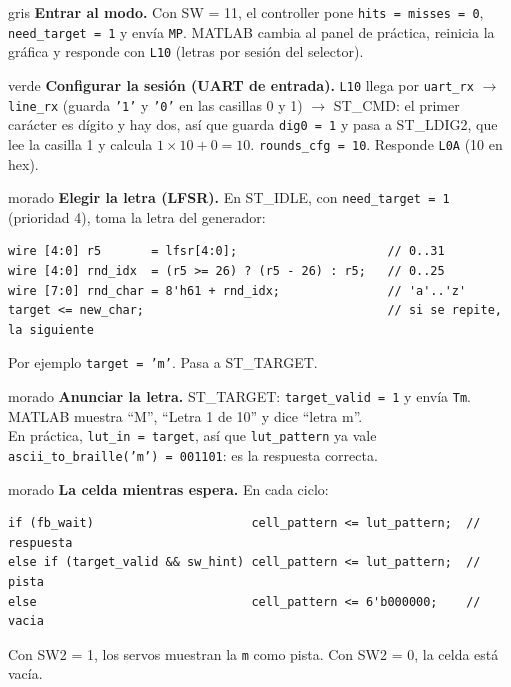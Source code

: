 \documentclass[11pt,a4paper]{article}
\newcommand{\cod}[1]{\texttt{#1}}
\begin{document}
\begin{paso}{gris}
\textbf{Entrar al modo.} Con SW = 11, el controller pone
\cod{hits = misses = 0}, \cod{need\_target = 1} y envía \cod{MP}. MATLAB cambia al
panel de práctica, reinicia la gráfica y responde con \cod{L10} (letras por sesión
del selector).
\end{paso}

\begin{paso}{verde}
\textbf{Configurar la sesión (UART de entrada).} \cod{L10} llega por
\cod{uart\_rx} $\to$ \cod{line\_rx} (guarda \cod{'1'} y \cod{'0'} en las casillas 0 y 1)
$\to$ ST\_CMD: el primer carácter es dígito y hay dos, así que guarda
\cod{dig0 = 1} y pasa a ST\_LDIG2, que lee la casilla 1 y calcula
$1 \times 10 + 0 = 10$. \cod{rounds\_cfg = 10}. Responde \cod{L0A} (10 en hex).
\end{paso}

\begin{paso}{morado}
\textbf{Elegir la letra (LFSR).} En ST\_IDLE, con \cod{need\_target = 1}
(prioridad 4), toma la letra del generador:
\begin{lstlisting}
wire [4:0] r5       = lfsr[4:0];                     // 0..31
wire [4:0] rnd_idx  = (r5 >= 26) ? (r5 - 26) : r5;   // 0..25
wire [7:0] rnd_char = 8'h61 + rnd_idx;               // 'a'..'z'
target <= new_char;                                  // si se repite, la siguiente
\end{lstlisting}
Por ejemplo \cod{target = 'm'}. Pasa a ST\_TARGET.
\end{paso}

\begin{paso}{morado}
\textbf{Anunciar la letra.} ST\_TARGET: \cod{target\_valid = 1} y envía
\cod{Tm}. MATLAB muestra ``M'', ``Letra 1 de 10'' y dice ``letra m''.\\
En práctica, \cod{lut\_in = target}, así que \cod{lut\_pattern} ya vale
\cod{ascii\_to\_braille('m') = 001101}: es la respuesta correcta.
\end{paso}

\begin{paso}{morado}
\textbf{La celda mientras espera.} En cada ciclo:
\begin{lstlisting}
if (fb_wait)                      cell_pattern <= lut_pattern;  // respuesta
else if (target_valid && sw_hint) cell_pattern <= lut_pattern;  // pista
else                              cell_pattern <= 6'b000000;    // vacia
\end{lstlisting}
Con SW2 = 1, los servos muestran la \cod{m} como pista. Con SW2 = 0, la celda está vacía.
\end{paso}
\end{document}
